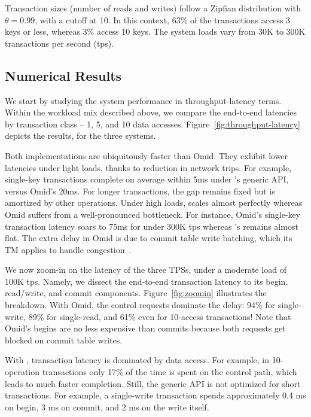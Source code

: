 Transaction sizes (number of reads and writes) follow a Zipfian distribution with $\theta=0.99$, with a cutoff at 10. 
In this context, 63\% of the transactions access 3 keys or less, whereas 3\% access 10 keys. The system loads
vary from 30K to 300K transactions per second (tps). 

\subsection{Numerical Results} 

We start by studying the system performance in throughput-latency terms. 
Within the workload mix described above, we compare the end-to-end latencies by transaction class -- 
1, 5, and 10 data accesses. Figure~\ref{fig:throughput-latency} depicts the results, for the three systems. 

Both {\sys\/} implementations are ubiquitously faster than Omid. They exhibit lower latencies under light loads, 
thanks to reduction in network trips. For example, single-key transactions complete on average within 
5ms under {\sys}'s generic API, versus Omid's 20ms. For longer transactions, the gap remains fixed but is amortized 
by other operations. Under high loads, {\sys\/} scales almost perfectly whereas Omid suffers from a well-pronounced 
bottleneck. For instance, Omid's single-key transaction latency soars to 75ms for under 300K tps whereas
{\sys}'s remains almost flat. The extra delay in Omid is due to commit table write batching, which its TM applies 
to handle congestion~\cite{Omid2017}. %

We now zoom-in on the latency of the three TPSs, under a moderate load of 100K tps. Namely, we dissect the end-to-end 
transaction latency to its begin, read/write, and commit components. Figure~\ref{fig:zoomin} illustrates the breakdown. 
With Omid, the control requests dominate the delay: 94\% for single-write, 89\% for single-read, and 61\%
even for 10-access transactions! Note that Omid's begins are no less expensive than commits because both 
requests get blocked on commit table writes. 

With {\sys\/}, transaction latency is dominated by data access. For example, in 10-operation transactions only 
17\% of the time is spent on the control path, which leads to much faster completion. Still, the generic API is 
not optimized for short transactions. For example, a single-write transaction spends approximately 0.4 ms on 
begin, 3 ms on commit, and 2 ms on the write itself. 

